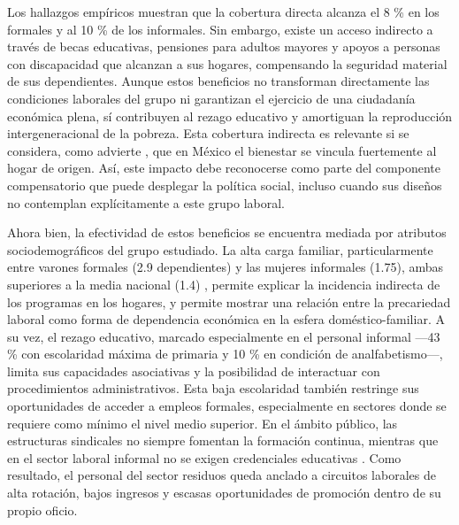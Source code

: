 \documentclass[
  spanish,
  11pt,
  a4paper,
]{scrbook}
\begin{document}
Los hallazgos empíricos muestran que la cobertura directa alcanza el 8
\% en los formales y al 10 \% de los informales. Sin embargo, existe un
acceso indirecto a través de becas educativas, pensiones para adultos
mayores y apoyos a personas con discapacidad que alcanzan a sus hogares,
compensando la seguridad material de sus dependientes. Aunque estos
beneficios no transforman directamente las condiciones laborales del
grupo ni garantizan el ejercicio de una ciudadanía económica plena, sí
contribuyen al rezago educativo y amortiguan la reproducción
intergeneracional de la pobreza. Esta cobertura indirecta es relevante
si se considera, como advierte \textcite{Huerta2012}, que en México el
bienestar se vincula fuertemente al hogar de origen. Así, este impacto
debe reconocerse como parte del componente compensatorio que puede
desplegar la política social, incluso cuando sus diseños no contemplan
explícitamente a este grupo laboral.

Ahora bien, la efectividad de estos beneficios se encuentra mediada por
atributos sociodemográficos del grupo estudiado. La alta carga familiar,
particularmente entre varones formales (2.9 dependientes) y las mujeres
informales (1.75), ambas superiores a la media nacional (1.4)
\autocite{CONEVAL2021}, permite explicar la incidencia indirecta de los
programas en los hogares, y permite mostrar una relación entre la
precariedad laboral como forma de dependencia económica en la esfera
doméstico-familiar. A su vez, el rezago educativo, marcado especialmente
en el personal informal ---43 \% con escolaridad máxima de primaria y 10
\% en condición de analfabetismo---, limita sus capacidades asociativas
y la posibilidad de interactuar con procedimientos administrativos. Esta
baja escolaridad también restringe sus oportunidades de acceder a
empleos formales, especialmente en sectores donde se requiere como
mínimo el nivel medio superior. En el ámbito público, las estructuras
sindicales no siempre fomentan la formación continua, mientras que en el
sector laboral informal no se exigen credenciales educativas
\autocite{Ibarrola2009}. Como resultado, el personal del sector residuos
queda anclado a circuitos laborales de alta rotación, bajos ingresos y
escasas oportunidades de promoción dentro de su propio oficio.
\end{document}
